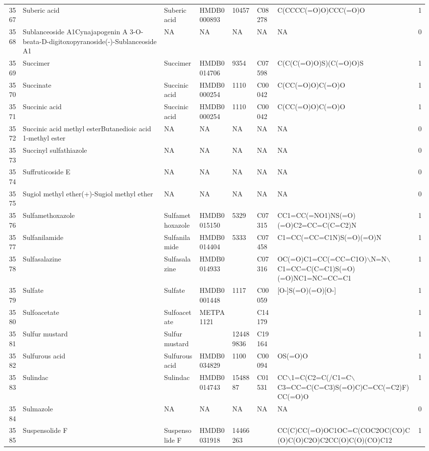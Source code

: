 \documentclass[a4paper]{article}
\begin{document}
\begin{longtable}{rlllllll}
  3567 & Suberic acid & Suberic acid & HMDB0000893 & 10457 & C08278 & C(CCCC(=O)O)CCC(=O)O & 1 \\ 
  3568 & Sublanceoside A1Cynajapogenin A 3-O-beata-D-digitoxopyranoside(-)-Sublanceoside A1 & NA & NA & NA & NA & NA & 0 \\ 
  3569 & Succimer & Succimer & HMDB0014706 & 9354 & C07598 & C(C(C(=O)O)S)(C(=O)O)S & 1 \\ 
  3570 & Succinate & Succinic acid & HMDB0000254 & 1110 & C00042 & C(CC(=O)O)C(=O)O & 1 \\ 
  3571 & Succinic acid & Succinic acid & HMDB0000254 & 1110 & C00042 & C(CC(=O)O)C(=O)O & 1 \\ 
  3572 & Succinic acid methyl esterButanedioic acid 1-methyl ester & NA & NA & NA & NA & NA & 0 \\ 
  3573 & Succinyl sulfathiazole & NA & NA & NA & NA & NA & 0 \\ 
  3574 & Suffruticoside E & NA & NA & NA & NA & NA & 0 \\ 
  3575 & Sugiol methyl ether(+)-Sugiol methyl ether & NA & NA & NA & NA & NA & 0 \\ 
  3576 & Sulfamethoxazole & Sulfamethoxazole & HMDB0015150 & 5329 & C07315 & CC1=CC(=NO1)NS(=O)(=O)C2=CC=C(C=C2)N & 1 \\ 
  3577 & Sulfanilamide & Sulfanilamide & HMDB0014404 & 5333 & C07458 & C1=CC(=CC=C1N)S(=O)(=O)N & 1 \\ 
  3578 & Sulfasalazine & Sulfasalazine & HMDB0014933 &  & C07316 & OC(=O)C1=CC(=CC=C1O)$\backslash$N=N$\backslash$C1=CC=C(C=C1)S(=O)(=O)NC1=NC=CC=C1 & 1 \\ 
  3579 & Sulfate & Sulfate & HMDB0001448 & 1117 & C00059 & [O-]S(=O)(=O)[O-] & 1 \\ 
  3580 & Sulfoacetate & Sulfoacetate & METPA1121 &  & C14179 &  & 1 \\ 
  3581 & Sulfur mustard & Sulfur mustard &  & 124489836 & C19164 &  & 1 \\ 
  3582 & Sulfurous acid & Sulfurous acid & HMDB0034829 & 1100 & C00094 & OS(=O)O & 1 \\ 
  3583 & Sulindac & Sulindac & HMDB0014743 & 1548887 & C01531 & CC$\backslash$1=C(C2=C(/C1=C$\backslash$C3=CC=C(C=C3)S(=O)C)C=CC(=C2)F)CC(=O)O & 1 \\ 
  3584 & Sulmazole & NA & NA & NA & NA & NA & 0 \\ 
  3585 & Suspensolide F & Suspensolide F & HMDB0031918 & 14466263 &  & CC(C)CC(=O)OC1OC=C(COC2OC(CO)C(O)C(O)C2O)C2CC(O)C(O)(CO)C12 & 1 \\ 

\end{longtable}
\end{document}
